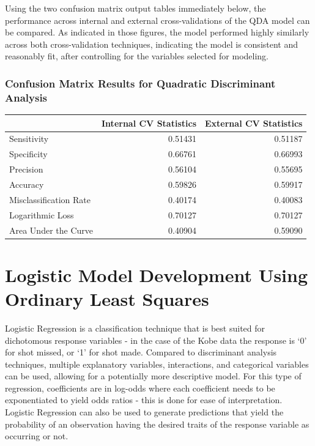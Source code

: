 \documentclass[american,]{article}
\begin{document}
Using the two confusion matrix output tables immediately below, the performance across internal and external cross-validations of the QDA model can be compared. As indicated in those figures, the model performed highly similarly across both cross-validation techniques, indicating the model is consistent and reasonably fit, after controlling for the variables selected for modeling.

\hypertarget{confusion-matrix-results-for-quadratic-discriminant-analysis}{%
\subsubsection{\texorpdfstring{\textbf{Confusion Matrix Results for Quadratic Discriminant Analysis}}{Confusion Matrix Results for Quadratic Discriminant Analysis}}\label{confusion-matrix-results-for-quadratic-discriminant-analysis}}

\begin{table}[H]
\centering
\begin{tabular}{lrr}
\toprule
  & Internal CV Statistics & External CV Statistics\\
\midrule
\rowcolor{gray!6}  Sensitivity & 0.51431 & 0.51187\\
Specificity & 0.66761 & 0.66993\\
\rowcolor{gray!6}  Precision & 0.56104 & 0.55695\\
Accuracy & 0.59826 & 0.59917\\
\rowcolor{gray!6}  Misclassification Rate & 0.40174 & 0.40083\\
\addlinespace
Logarithmic Loss & 0.70127 & 0.70127\\
\rowcolor{gray!6}  Area Under the Curve & 0.40904 & 0.59090\\
\bottomrule
\end{tabular}
\end{table}

\hypertarget{logistic-model-development-using-ordinary-least-squares}{%
\section{\texorpdfstring{\textbf{Logistic Model Development Using Ordinary Least Squares}}{Logistic Model Development Using Ordinary Least Squares}}\label{logistic-model-development-using-ordinary-least-squares}}

Logistic Regression is a classification technique that is best suited for dichotomous response variables - in the case of the Kobe data the response is `0' for shot missed, or `1' for shot made. Compared to discriminant analysis techniques, multiple explanatory variables, interactions, and categorical variables can be used, allowing for a potentially more descriptive model. For this type of regression, coefficients are in log-odds where each coefficient needs to be exponentiated to yield odds ratios - this is done for ease of interpretation. Logistic Regression can also be used to generate predictions that yield the probability of an observation having the desired traits of the response variable as occurring or not.
\end{document}
